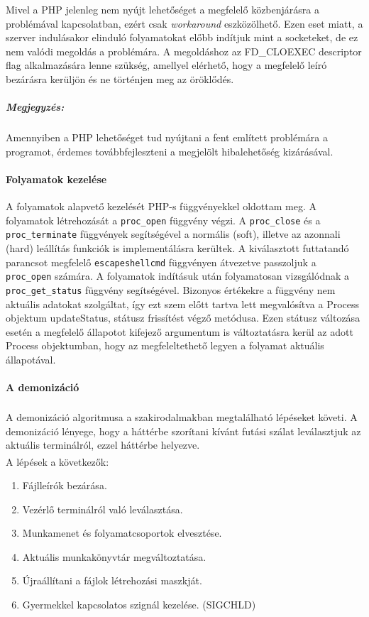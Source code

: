 \documentclass[12pt]{report}
\begin{document}
   Mivel a PHP jelenleg nem nyújt lehetőséget a megfelelő közbenjárásra a problémával kapcsolatban, ezért csak \textit{workaround} eszközölhető. Ezen eset miatt, a szerver indulásakor elinduló folyamatokat előbb indítjuk mint a socketeket, de ez nem valódi megoldás a problémára. A megoldáshoz az FD\_CLOEXEC descriptor flag alkalmazására lenne szükség, amellyel elérhető, hogy a megfelelő leíró bezárásra kerüljön és ne történjen meg az öröklődés.
   \subparagraph{Megjegyzés:}
   Amennyiben a PHP lehetőséget tud nyújtani a fent említett problémára a programot, érdemes továbbfejleszteni a megjelölt hibalehetőség kizárásával.
    
   \paragraph{Folyamatok kezelése}
   A folyamatok alapvető kezelését PHP-s függvényekkel oldottam meg. A folyamatok létrehozását a \verb|proc_open| függvény végzi. A \verb|proc_close| és a \verb|proc_terminate| függvények segítségével a normális (soft), illetve az azonnali (hard) leállítás funkciók is implementálásra kerültek. A kiválasztott futtatandó parancsot megfelelő \verb|escapeshellcmd| függvényen átvezetve passzoljuk a \verb|proc_open| számára.
   A folyamatok indításuk után folyamatosan vizsgálódnak a \verb|proc_get_status| függvény segítségével. Bizonyos értékekre a függvény nem aktuális adatokat szolgáltat, így ezt szem előtt tartva lett megvalósítva a Process objektum updateStatus, státusz frissítést végző metódusa. Ezen státusz változása esetén a megfelelő állapotot kifejező argumentum is változtatásra kerül az adott Process objektumban, hogy az megfeleltethető legyen a folyamat aktuális állapotával.
   \paragraph{A demonizáció}
   A demonizáció algoritmusa a szakirodalmakban\textsuperscript{\cite{stevens}} megtalálható lépéseket követi. A demonizáció lényege, hogy a háttérbe szorítani kívánt futási szálat leválasztjuk az aktuális terminálról, ezzel háttérbe helyezve.
   \\
   A lépések a következők\textsuperscript{\cite{daemon}}:
   \begin{enumerate}\centering\small
   		\item Fájlleírók bezárása.
        \item Vezérlő terminálról való leválasztása.
        \item Munkamenet és folyamatcsoportok elvesztése.
        \item Aktuális munkakönyvtár megváltoztatása.
        \item Újraállítani a fájlok létrehozási maszkját.
        \item Gyermekkel kapcsolatos szignál kezelése. (SIGCHLD)
   \end{enumerate}
 
\end{document}
